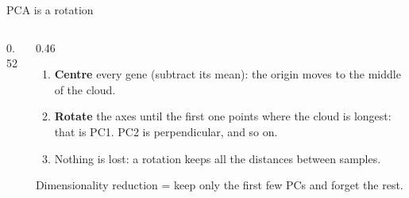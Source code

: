 \begin{frame}{PCA is a rotation}
  \begin{columns}[c]
    \begin{column}{0.52\linewidth}
      \centering
    \end{column}
    \begin{column}{0.46\linewidth}\small
      \begin{enumerate}\setlength\itemsep{4pt}
        \item \textbf{Centre} every gene (subtract its mean): the origin moves to the middle of the cloud.
        \item \textbf{Rotate} the axes until the first one points where the cloud is longest: that is \alert{PC1}. PC2 is perpendicular, and so on.
        \item Nothing is lost: a rotation keeps all the distances between samples.
      \end{enumerate}
      \vspace{0.2cm}
      \begin{block}{Dimensionality reduction}
        \footnotesize = keep only the first few PCs and forget the rest.
      \end{block}
    \end{column}
  \end{columns}
\end{frame}

